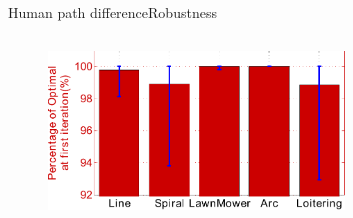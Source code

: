 \begin{frame}{Human path difference}{Robustness}
\bigskip

\begin{columns}
\begin{minipage}{\textwidth}
\begin{figure}
\centering
\includegraphics[width=0.7\textwidth]{./figure/InitOptInDiffHMP}
\end{figure}
\end{minipage}
\end{columns}

\end{frame}